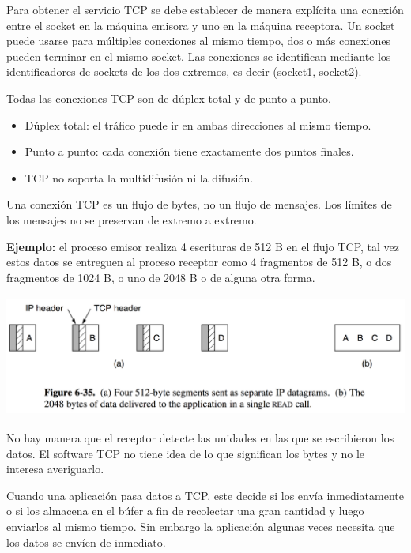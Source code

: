 \documentclass[10pt,a4paper]{report}
\begin{document}
	\par Para obtener el servicio TCP se debe establecer de manera explícita una conexión entre el socket en la máquina emisora y uno en la máquina receptora. Un socket puede usarse para múltiples conexiones al mismo tiempo, dos o más conexiones pueden terminar en el mismo socket. Las conexiones se identifican mediante los identificadores de sockets de los dos extremos, es decir (socket1, socket2).

	\par Todas las conexiones TCP son de dúplex total y de punto a punto.
	\begin{itemize}
		\item Dúplex total: el tráfico puede ir en ambas direcciones al mismo tiempo.
		\item Punto a punto: cada conexión tiene exactamente dos puntos finales.
		\item  TCP no soporta la multidifusión ni la difusión.
	\end{itemize}

	\par Una conexión TCP es un flujo de bytes, no un flujo de mensajes. Los límites de los 
mensajes no se preservan de extremo a extremo.

	\textbf{Ejemplo:} el proceso emisor realiza 4 escrituras de 512 B en el flujo TCP, tal 
vez estos datos se entreguen al proceso receptor como 4 fragmentos de 512 B, o dos 
fragmentos de 1024 B, o uno de 2048 B o de alguna otra forma.

	\begin{center}
	\includegraphics[width=14cm, height=4cm]{./imagenes/tcp.png} 
	\end{center}

	\par No hay manera que el receptor detecte las unidades en las que se escribieron los 
datos. El software TCP no tiene idea de lo que significan los bytes y no le interesa 
averiguarlo.

	\par Cuando una aplicación pasa datos a TCP, este decide si los envía inmediatamente 
o si los almacena en el búfer a fin de recolectar una gran cantidad y luego enviarlos al 
mismo tiempo. Sin embargo la aplicación algunas veces necesita que los datos se 
envíen de inmediato.
\end{document}
